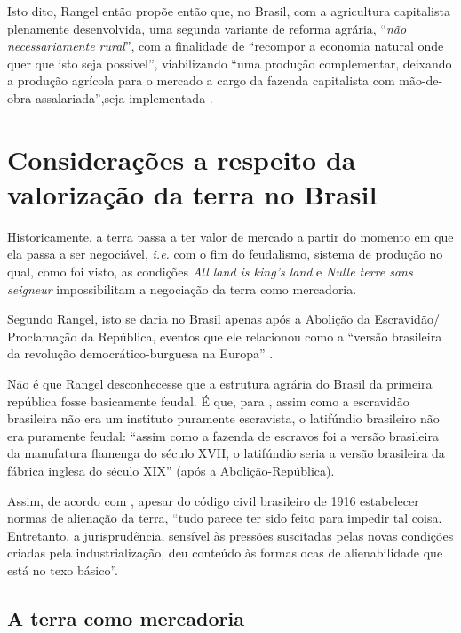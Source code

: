 \documentclass[
	12pt,				%
	oneside,			%
	a4paper,			%
	chapter=TITLE,		%
	section=TITLE,		%
	english,			%
	brazil				%
	]{abntex2}
\begin{document}
\begin{refsection}
Isto dito, Rangel então propõe então que, no Brasil, com a agricultura
capitalista plenamente desenvolvida, uma segunda variante de reforma agrária,
``\emph{não necessariamente rural}'', com a finalidade de ``recompor a economia natural
onde quer que isto seja possível'', viabilizando ``uma produção complementar,
deixando a produção agrícola para o mercado a cargo da fazenda capitalista com
mão-de-obra assalariada'',seja implementada \autocite[155]{rangel1986a}.

\hypertarget{considerauxe7uxf5es-a-respeito-da-valorizauxe7uxe3o-da-terra-no-brasil}{%
\section{Considerações a respeito da valorização da terra no Brasil}\label{considerauxe7uxf5es-a-respeito-da-valorizauxe7uxe3o-da-terra-no-brasil}}

Historicamente, a terra passa a ter valor de mercado a partir do momento em que
ela passa a ser negociável, \emph{i.e.} com o fim do feudalismo, sistema de produção
no qual, como foi visto, as condições \emph{All land is king's land} e
\emph{Nulle terre sans seigneur} impossibilitam a negociação da terra como
mercadoria.

Segundo Rangel, isto se daria no Brasil apenas após a Abolição da Escravidão/
Proclamação da República, eventos que ele relacionou como a ``versão brasileira
da revolução democrático-burguesa na Europa'' \autocite[p.~314]{dualidade-basica}.

Não é que Rangel desconhecesse que a estrutura agrária do Brasil da primeira
república fosse basicamente feudal. É que, para \textcite[p.~316]{dualidade-basica},
assim como a escravidão brasileira não era um instituto puramente escravista, o
latifúndio brasileiro não era puramente feudal: ``assim como a fazenda de
escravos foi a versão brasileira da manufatura flamenga do século XVII, o
latifúndio seria a versão brasileira da fábrica inglesa do século XIX'' (após a
Abolição-República).

Assim, de acordo com \textcite[p.~206-207]{rangel1960}, apesar do código civil brasileiro
de 1916 estabelecer normas de alienação da terra, ``tudo parece ter sido feito
para impedir tal coisa. Entretanto, a jurisprudência, sensível às pressões
suscitadas pelas novas condições criadas pela industrialização, deu conteúdo às
formas ocas de alienabilidade que está no texo básico''.

\hypertarget{a-terra-como-mercadoria}{%
\subsection{A terra como mercadoria}\label{a-terra-como-mercadoria}}


\end{refsection}
\end{document}
